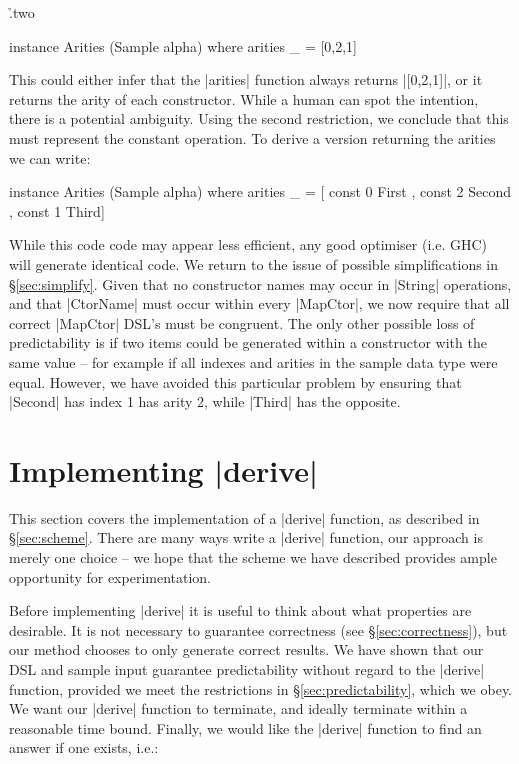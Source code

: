 \documentclass[preprint,draft]{sigplanconf}
\begin{document}
\h{.two}\begin{code}
instance Arities (Sample alpha) where
    arities _ = [0,2,1]
\end{code}

This could either infer that the |arities| function always returns |[0,2,1]|, or it returns the arity of each constructor. While a human can spot the intention, there is a potential ambiguity. Using the second restriction, we conclude that this must represent the constant operation. To derive a version returning the arities we can write:

\begin{code}
instance Arities (Sample alpha) where
    arities _ =  [  const 0 First{}
                 ,  const 2 Second{}
                 ,  const 1 Third{}]
\end{code}

While this code code may appear less efficient, any good optimiser (i.e. GHC) will generate identical code. We return to the issue of possible simplifications in \S\ref{sec:simplify}. Given that no constructor names may occur in |String| operations, and that |CtorName| must occur within every |MapCtor|, we now require that all correct |MapCtor| DSL's must be congruent. The only other possible loss of predictability is if two items could be generated within a constructor with the same value -- for example if all indexes and arities in the sample data type were equal. However, we have avoided this particular problem by ensuring that |Second| has index 1 has arity 2, while |Third| has the opposite.


\section{Implementing |derive|}
\label{sec:guess}

This section covers the implementation of a |derive| function, as described in \S\ref{sec:scheme}. There are many ways write a |derive| function, our approach is merely one choice -- we hope that the scheme we have described provides ample opportunity for experimentation.

Before implementing |derive| it is useful to think about what properties are desirable. It is not necessary to guarantee correctness (see \S\ref{sec:correctness}), but our method chooses to only generate correct results. We have shown that our DSL and sample input guarantee predictability without regard to the |derive| function, provided we meet the restrictions in \S\ref{sec:predictability}, which we obey. We want our |derive| function to terminate, and ideally terminate within a reasonable time bound. Finally, we would like the |derive| function to find an answer if one exists, i.e.:
\end{document}
